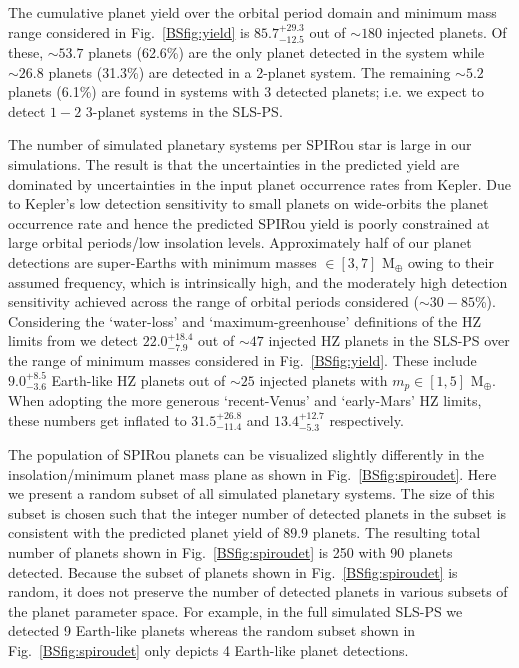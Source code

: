 The cumulative planet yield over the orbital period domain and minimum mass range considered in
Fig.~\ref{BSfig:yield} is $85.7^{+29.3}_{-12.5}$ out of $\sim 180$ injected planets.
Of these, $\sim 53.7$ planets (62.6\%) are
the only planet detected in the system while $\sim 26.8$ planets (31.3\%) are detected in a
2-planet system. The remaining
$\sim 5.2$ planets (6.1\%) are found in systems with 3 detected planets; i.e. we expect to detect
$1-2$ 3-planet systems in the SLS-PS.

The number of simulated planetary systems per SPIRou star is large in our simulations. The
result is that the uncertainties in the
predicted yield are dominated by uncertainties in the input planet occurrence
rates from Kepler. Due to Kepler's low detection sensitivity to small planets on
wide-orbits the planet occurrence rate and hence the predicted SPIRou yield is
poorly constrained at large orbital periods/low insolation levels.
Approximately half of our planet detections are super-Earths
with minimum masses \msini{} $\in [3,7]$ M$_{\oplus}$ owing to their assumed frequency,
which is intrinsically
high, and the moderately high detection sensitivity achieved across the
range of orbital periods considered ($\sim 30-85$\%). Considering the `water-loss' and
`maximum-greenhouse' definitions of the HZ limits from
\citep{kopparapu13} we detect $22.0^{+18.4}_{-7.9}$ out of $\sim 47$ injected
HZ planets in the SLS-PS over the range of minimum masses considered in Fig.~\ref{BSfig:yield}. These include
$9.0^{+8.5}_{-3.6}$ Earth-like HZ planets out of $\sim 25$ injected planets with $m_p \in [1,5]$ M$_{\oplus}$.
When adopting the more generous `recent-Venus' and `early-Mars' HZ limits, these numbers get inflated to
$31.5^{+26.8}_{-11.4}$ and $13.4^{+12.7}_{-5.3}$ respectively. 

The population of SPIRou planets can be visualized slightly differently in the
insolation/minimum planet mass plane as shown in Fig.~\ref{BSfig:spiroudet}. Here we
present a random subset of all simulated planetary systems. The size of this subset is
chosen such that the integer number of detected planets in the subset is consistent with
the predicted planet yield of $89.9$ planets. The resulting total number
of planets shown in Fig.~\ref{BSfig:spiroudet} is 250 with 90 planets detected. Because the
subset of planets shown in Fig.~\ref{BSfig:spiroudet} is random, it does not preserve the
number of detected planets in various subsets of the planet parameter space. For example,
in the full simulated SLS-PS we detected 9 Earth-like planets whereas the random subset
shown in Fig.~\ref{BSfig:spiroudet} only depicts 4 Earth-like planet detections.


